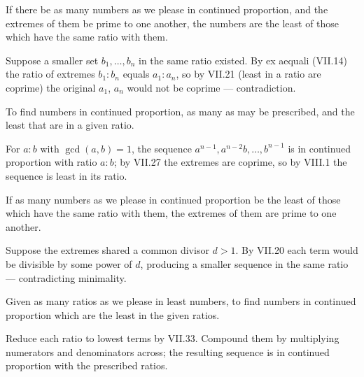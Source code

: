 \documentclass{rrxiv}
\begin{document}
\begin{claim}
\label{prop:VIII.1}
If there be as many numbers as we please in continued proportion, and
the extremes of them be prime to one another, the numbers are the
least of those which have the same ratio with them.
\end{claim}
\begin{evidence}
\label{ev:VIII.1}
Suppose a smaller set $b_1, \dots, b_n$ in the same ratio existed.
By ex aequali (VII.14) the ratio of extremes $b_1 : b_n$ equals $a_1
: a_n$, so by VII.21 (least in a ratio are coprime) the original
$a_1$, $a_n$ would not be coprime --- contradiction.
\end{evidence}

\begin{claim}
\label{prop:VIII.2}
To find numbers in continued proportion, as many as may be prescribed,
and the least that are in a given ratio.
\end{claim}
\begin{evidence}
\label{ev:VIII.2}
For $a : b$ with $\gcd(a, b) = 1$, the sequence $a^{n-1}, a^{n-2}
b, \dots, b^{n-1}$ is in continued proportion with ratio $a : b$; by
VII.27 the extremes are coprime, so by VIII.1 the sequence is least
in its ratio.
\end{evidence}

\begin{claim}
\label{prop:VIII.3}
If as many numbers as we please in continued proportion be the least
of those which have the same ratio with them, the extremes of them
are prime to one another.
\end{claim}
\begin{evidence}
\label{ev:VIII.3}
Suppose the extremes shared a common divisor $d > 1$.  By VII.20
each term would be divisible by some power of $d$, producing a
smaller sequence in the same ratio --- contradicting minimality.
\end{evidence}

\begin{claim}
\label{prop:VIII.4}
Given as many ratios as we please in least numbers, to find numbers
in continued proportion which are the least in the given ratios.
\end{claim}
\begin{evidence}
\label{ev:VIII.4}
Reduce each ratio to lowest terms by VII.33.  Compound them by
multiplying numerators and denominators across; the resulting
sequence is in continued proportion with the prescribed ratios.
\end{evidence}
\end{document}
